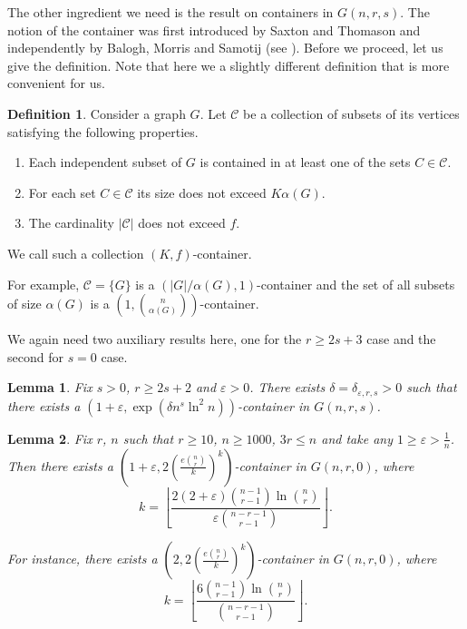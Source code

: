 \documentclass[12pt]{article}
\newtheorem{lemma}{Lemma}[section]
\theoremstyle{remark}
\theoremstyle{definition}
\newtheorem{definition}{Definition}[section]
\newcommand{\skob}[1]{\left(#1\right)}
\newcommand{\flr}[1]{\left\lfloor#1\right\rfloor}
\begin{document}
The other ingredient we need is the result on containers in $G(n,r,s)$. The notion of the container was first introduced by Saxton and Thomason and independently by Balogh, Morris and Samotij (see \cite{Cont1, Cont2}). Before we proceed, let us give the definition. Note that here we a slightly different definition that is more convenient for us.

\begin{definition}
    Consider a graph $G$. Let $\mathcal{C}$ be a collection of subsets of its vertices satisfying the following properties.
    \begin{enumerate}
        \item Each independent subset of $G$ is contained in at least one of the sets $C \in \mathcal{C}$.

        \item For each set $C \in \mathcal{C}$ its size does not exceed $K\alpha(G)$.

        \item The cardinality $|\mathcal{C}|$ does not exceed $f$.
    \end{enumerate}
    We call such a collection $(K, f)$-container.
\end{definition}

For example, $\mathcal{C} = \{G\}$ is a $(|G| / \alpha(G), 1)$-container and the set of all subsets of size $\alpha(G)$ is a $\skob{1, \binom{n}{\alpha(G)}}$-container.

We again need two auxiliary results here, one for the $r \geq 2s+3$ case and the second for $s = 0$ case. 

\begin{lemma}
    \label{mainL}
    Fix $s > 0$, $r \geq 2s+2$ and $\varepsilon > 0$. There exists $\delta = \delta_{\varepsilon, r, s} > 0$ such that there exists a $(1 + \varepsilon, \exp\skob{\delta n^s \ln^2 n})$-container in $G(n,r,s)$.
\end{lemma}

\begin{lemma}
    	\label{mainLKG}
    	Fix $r$, $n$ such that $r \geq 10$, $n \geq 1000$, $3r \leq n$ and take any $1 \geq \varepsilon > \frac{1}{n}$. Then there exists a $\skob{1 + \varepsilon,2\skob{\frac{e\binom{n}{r}}{k}}^k}$-container in $G(n,r,0)$, where 
	$$
		k =  \flr{\frac{2(2+\varepsilon)\binom{n-1}{r-1}\ln \binom{n}{r}}{\varepsilon\binom{n-r-1}{r-1}}}.
	$$

    For instance, there exists a $\skob{2, 2\skob{\frac{e\binom{n}{r}}{k}}^k}$-container in $G(n,r,0)$, where 
	$$
		k =  \flr{\frac{6\binom{n-1}{r-1}\ln \binom{n}{r}}{\binom{n-r-1}{r-1}}}.
	$$
\end{lemma}
\end{document}
